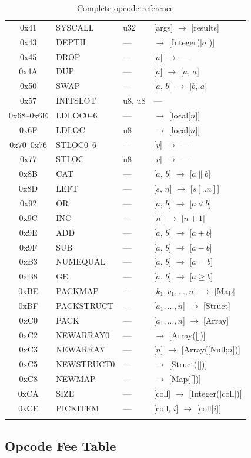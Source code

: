 \documentclass[11pt,a4paper]{article}
\begin{document}
\begin{longtable}{@{}cllp{6cm}@{}}
0x41 & SYSCALL & u32 & [args] $\to$ [results] \\
0x43 & DEPTH & --- & $\to$ [Integer($|\sigma|$)] \\
0x45 & DROP & --- & [$a$] $\to$ --- \\
0x4A & DUP & --- & [$a$] $\to$ [$a$, $a$] \\
0x50 & SWAP & --- & [$a$, $b$] $\to$ [$b$, $a$] \\
0x57 & INITSLOT & u8, u8 & --- \\
0x68--0x6E & LDLOC0--6 & --- & $\to$ [local[$n$]] \\
0x6F & LDLOC & u8 & $\to$ [local[$n$]] \\
0x70--0x76 & STLOC0--6 & --- & [$v$] $\to$ --- \\
0x77 & STLOC & u8 & [$v$] $\to$ --- \\
0x8B & CAT & --- & [$a$, $b$] $\to$ [$a \| b$] \\
0x8D & LEFT & --- & [$s$, $n$] $\to$ [$s[..n]$] \\
0x92 & OR & --- & [$a$, $b$] $\to$ [$a \lor b$] \\
0x9C & INC & --- & [$n$] $\to$ [$n+1$] \\
0x9E & ADD & --- & [$a$, $b$] $\to$ [$a+b$] \\
0x9F & SUB & --- & [$a$, $b$] $\to$ [$a-b$] \\
0xB3 & NUMEQUAL & --- & [$a$, $b$] $\to$ [$a = b$] \\
0xB8 & GE & --- & [$a$, $b$] $\to$ [$a \geq b$] \\
0xBE & PACKMAP & --- & [$k_1,v_1,...,n$] $\to$ [Map] \\
0xBF & PACKSTRUCT & --- & [$a_1,...,n$] $\to$ [Struct] \\
0xC0 & PACK & --- & [$a_1,...,n$] $\to$ [Array] \\
0xC2 & NEWARRAY0 & --- & $\to$ [Array([])] \\
0xC3 & NEWARRAY & --- & [$n$] $\to$ [Array([Null;$n$])] \\
0xC5 & NEWSTRUCT0 & --- & $\to$ [Struct([])] \\
0xC8 & NEWMAP & --- & $\to$ [Map([])] \\
0xCA & SIZE & --- & [coll] $\to$ [Integer($|$coll$|$)] \\
0xCE & PICKITEM & --- & [coll, $i$] $\to$ [coll[$i$]] \\
\bottomrule
\caption{Complete opcode reference}
\label{tab:opcodes}
\end{longtable}

\subsection{Opcode Fee Table}
\end{document}
